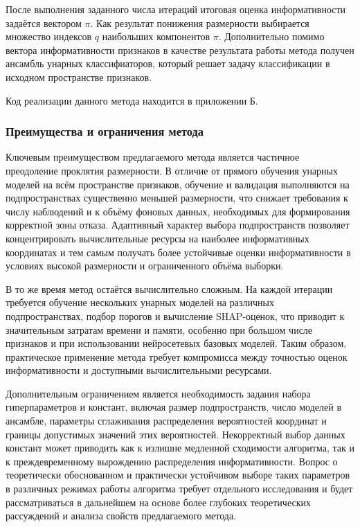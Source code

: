 \documentclass[12pt,a4paper]{article}
\begin{document}
После выполнения заданного числа итераций итоговая оценка информативности задаётся вектором $\pi$.
Как результат понижения размерности выбирается множество индексов $q$ наибольших компонентов $\pi$.
Дополнительно помимо вектора информативности признаков в качестве результата работы метода получен ансамбль унарных
классифиаторов, который решает задачу классификации в исходном пространстве признаков.

Код реализации данного метода находится в приложении Б.

\subsubsection{Преимущества и ограничения метода}

Ключевым преимуществом предлагаемого метода является частичное преодоление проклятия размерности.
В отличие от прямого обучения унарных моделей на всём пространстве признаков, обучение и валидация
выполняются на подпространствах существенно меньшей размерности, что снижает требования к числу
наблюдений и к объёму фоновых данных, необходимых для формирования корректной зоны отказа.
Адаптивный характер выбора подпространств позволяет концентрировать вычислительные ресурсы на
наиболее информативных координатах и тем самым получать более устойчивые оценки информативности
в условиях высокой размерности и ограниченного объёма выборки.

В то же время метод остаётся вычислительно сложным. На каждой итерации требуется обучение
нескольких унарных моделей на различных подпространствах, подбор порогов и вычисление SHAP-оценок,
что приводит к значительным затратам времени и памяти, особенно при большом числе признаков
и при использовании нейросетевых базовых моделей. Таким образом, практическое применение метода
требует компромисса между точностью оценок информативности и доступными вычислительными ресурсами.

Дополнительным ограничением является необходимость задания набора гиперпараметров и констант,
включая размер подпространств, число моделей в ансамбле, параметры сглаживания распределения
вероятностей координат и границы допустимых значений этих вероятностей. Некорректный выбор данных
констант может приводить как к излишне медленной сходимости алгоритма, так и к преждевременному
вырождению распределения информативности. Вопрос о теоретически обоснованном и практически
устойчивом выборе таких параметров в различных режимах работы алгоритма требует отдельного
исследования и будет рассматриваться в дальнейшем на основе более глубоких теоретических
рассуждений и анализа свойств предлагаемого метода.
\end{document}

